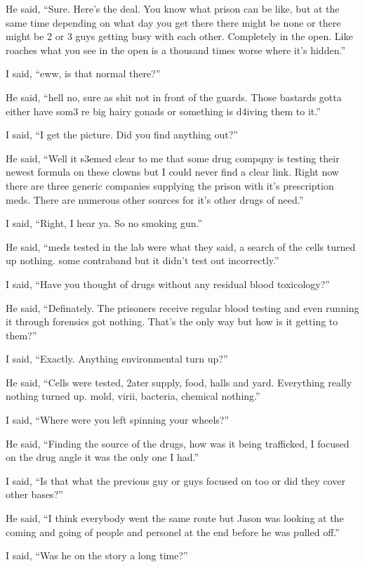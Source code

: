 He said, ``Sure. Here's the deal. You know what prison can be like, but at the same time depending on what day you get there there might be none or there might be 2 or 3 guys getting busy with each other. Completely in the open. Like roaches what you see in the open is a thousand times worse where it's hidden.''

I said, ``eww, is that normal there?''

He said, ``hell no, sure as shit not in front of the guards. Those bastards gotta either have som3 re big hairy gonads or something is d4iving them to it.''

I said, ``I get the picture. Did you find anything out?''

He said, ``Well it s3emed clear to me that some drug compqny is testing their newest formula on these clowns but I could never find a clear link. Right now there are three generic companies supplying the prison with it's prescription meds. There are numerous other sources for it's other drugs of need.''

I said, ``Right, I hear ya. So no smoking gun.''

He said, ``meds tested in the lab were what they said, a search of the cells turned up nothing. some contraband but it didn't test out incorrectly.''

I said, ``Have you thought of drugs without any residual blood toxicology?''

He said, ``Definately. The prisoners receive regular blood testing and even running it through forensics got nothing. That's the only way but how is it getting to them?''

I said, ``Exactly. Anything environmental turn up?''

He said, ``Cells were tested, 2ater supply, food, halls and yard. Everything really nothing turned up. mold, virii, bacteria, chemical nothing.''

I said, ``Where were you left spinning your wheels?''

He said, ``Finding the source of the drugs, how was it being trafficked, I focused on the drug angle it was the only one I had.''

I said, ``Is that what the previous guy or guys focused on too or did they cover other bases?''

He said, ``I think everybody went the same route but Jason was looking at the coming and going of people and personel at the end before he was pulled off.''

I said, ``Was he on the story a long time?''

